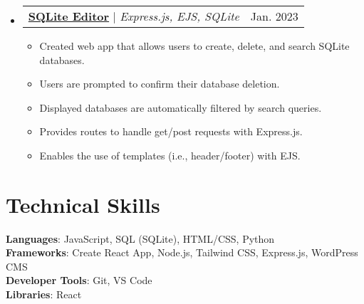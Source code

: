 \documentclass[letterpaper,11pt]{article}
\makeatletter
\newcommand{\resumeItem}[1]{
  \item\small{
    {#1 \vspace{-2pt}}
  }
}
\newcommand{\resumeProjectHeading}[2]{
    \item
    \begin{tabular*}{0.97\textwidth}{l@{\extracolsep{\fill}}r}
      \small#1 & #2 \\
    \end{tabular*}\vspace{-7pt}
}
\newcommand{\resumeSubHeadingListStart}{\begin{itemize}[leftmargin=0.15in, label={}]}
\newcommand{\resumeSubHeadingListEnd}{\end{itemize}}
\newcommand{\resumeItemListStart}{\begin{itemize}}
\newcommand{\resumeItemListEnd}{\end{itemize}\vspace{-5pt}}
\makeatother
\begin{document}
    \resumeSubHeadingListStart
      \resumeProjectHeading
          {\href{https://github.com/benjaminarnett/sqlite-editor}{\textbf{SQLite Editor}} $|$ \emph{Express.js, EJS, SQLite}}{Jan. 2023}
          \resumeItemListStart
            \resumeItem{Created web app that allows users to create, delete, and search SQLite databases.} 
            \resumeItem{Users are prompted to confirm their database deletion.}
            \resumeItem{Displayed databases are automatically filtered by search queries.} 
            \resumeItem{Provides routes to handle get/post requests with Express.js.} 
            \resumeItem{Enables the use of templates (i.e., header/footer) with EJS.}
          \resumeItemListEnd
    \resumeSubHeadingListEnd
    



%
\section{Technical Skills}
 \begin{itemize}[leftmargin=0.15in, label={}]
    \small{\item{
     \textbf{Languages}{: JavaScript, SQL (SQLite), HTML/CSS, Python} \\
     \textbf{Frameworks}{: Create React App, Node.js, Tailwind CSS, Express.js, WordPress CMS} \\
     \textbf{Developer Tools}{: Git, VS Code} \\
     \textbf{Libraries}{: React}
    }}
 \end{itemize}


\end{document}
